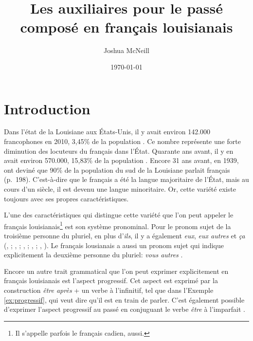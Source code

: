 \documentclass{article}
\author{Joshua McNeill}
\date{\today}
\title{Les auxiliaires pour le passé composé en français louisianais}
\newcommand{\lexi}[1]{\textit{#1}}
\begin{document}
  \maketitle
  \section{Introduction}
    \label{sec:intro}
    Dans l'état de la Louisiane aux États-Unis, il y avait environ 142.000 francophones en 2010, 3,45\% de la population \parencite{mla_louisiana_nodate}.
    Ce nombre représente une forte diminution des locuteurs du français dans l'État.
    Quarante ans avant, il y en avait environ 570.000, 15,83\% de la population \parencite[p.~159]{us_department_of_commerce_1970_1973}.
    Encore 31 ans avant, en 1939, \textcite{smith_influence_1939} ont deviné que 90\% de la population du sud de la Louisiane parlait français (p.~198).
    C'est-à-dire que le français a été la langue majoritaire de l'État, mais au cours d'un siècle, il est devenu une langue minoritaire.
    Or, cette variété existe toujours avec ses propres caractéristiques.

    L'une des caractéristiques qui distingue cette variété que l'on peut appeler le français louisianais\footnote{Il s'appelle parfois le français cadien, aussi.} est son système pronominal.
    Pour le pronom sujet de la troisième personne du pluriel, en plus d'\lexi{ils}, il y a également \lexi{eux}, \lexi{eux autres} et \lexi{ça} (\citeauthor{brown_pronominal_1988}, \citeyear[pp.~152-153]{brown_pronominal_1988}; \citeauthor{byers_defining_1988}, \citeyear[pp.~88-92]{byers_defining_1988}; \citeauthor{dajko_ethnic_2009}, \citeyear[p.~144]{dajko_ethnic_2009}; \citeauthor{rottet_language_1995}, \citeyear[p.~175]{rottet_language_1995}; \citeauthor{smith_morphosyntactic_1994}, \citeyear[p.~60]{smith_morphosyntactic_1994}).
    Le français lousianais a aussi un pronom sujet qui indique explicitement la deuxième personne du pluriel: \lexi{vous autres} \parencite[p.~175]{rottet_language_1995}.

    Encore un autre trait grammatical que l'on peut exprimer explicitement en français louisianais est l'aspect progressif.
    Cet aspect est exprimé par la construction \lexi{être après} + un verbe à l'infinitif, tel que dans l'Exemple \ref{ex:progressif}, qui veut dire qu'il est en train de parler.
    C'est également possible d'exprimer l'aspect progressif au passé en conjuguant le verbe \lexi{être} à l'imparfait \parencite[p.~102]{papen_structural_1997}.
\end{document}
